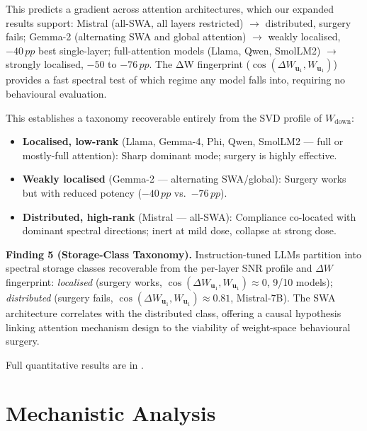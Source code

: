 \documentclass{article}
\newcommand{\pp}{\,pp}
\begin{document}
This predicts a gradient across attention architectures, which our expanded results support: Mistral (all-SWA, all layers restricted) $\rightarrow$ distributed, surgery fails; Gemma-2 (alternating SWA and global attention) $\rightarrow$ weakly localised, $-40\pp$ best single-layer; full-attention models (Llama, Qwen, SmolLM2) $\rightarrow$ strongly localised, $-50$ to $-76\pp$. The ΔW fingerprint ($\cos(\Delta W_{\mathbf{u}_1}, W_{\mathbf{u}_1})$) provides a fast spectral test of which regime any model falls into, requiring no behavioural evaluation.

This establishes a taxonomy recoverable entirely from the SVD profile of $W_\mathrm{down}$:

\begin{itemize}[leftmargin=1.4em,itemsep=1pt,topsep=2pt]
\item \textbf{Localised, low-rank} (Llama, Gemma-4, Phi, Qwen, SmolLM2 — full or mostly-full attention): Sharp dominant mode; surgery is highly effective.
\item \textbf{Weakly localised} (Gemma-2 — alternating SWA/global): Surgery works but with reduced potency ($-40\pp$ vs.\ $-76\pp$).
\item \textbf{Distributed, high-rank} (Mistral — all-SWA): Compliance co-located with dominant spectral directions; inert at mild dose, collapse at strong dose.
\end{itemize}

\begin{findingbox}
\textbf{Finding 5 (Storage-Class Taxonomy).}
Instruction-tuned LLMs partition into spectral storage classes recoverable from the per-layer SNR profile and $\Delta W$ fingerprint: \emph{localised} (surgery works, $\cos(\Delta W_{\mathbf{u}_1}, W_{\mathbf{u}_1}) \approx 0$, 9/10 models); \emph{distributed} (surgery fails, $\cos(\Delta W_{\mathbf{u}_1}, W_{\mathbf{u}_1}) \approx 0.81$, Mistral-7B). The SWA architecture correlates with the distributed class, offering a causal hypothesis linking attention mechanism design to the viability of weight-space behavioural surgery.
\end{findingbox}

Full quantitative results are in .

\section{Mechanistic Analysis}
\label{sec:mechanistic}
\end{document}
